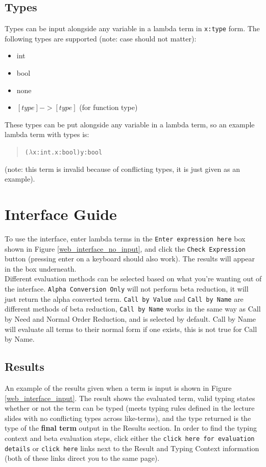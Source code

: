 \documentclass[a4paper,11pt]{article}
\begin{document}
\subsection{Types}
Types can be input alongside any variable in a lambda term in \texttt{x:type} form. The following types are supported (note: case should not matter):

\begin{itemize}
	\item int
	\item bool
	\item none
	\item $[type] -> [type]$ (for function type)
\end{itemize}

These types can be put alongside any variable in a lambda term, so an example lambda term with types is:
\begin{quotation} \texttt{($\lambda$x:int.x:bool)y:bool} \end{quotation}
(note: this term is invalid because of conflicting types, it is just given as an example).

\section{Interface Guide}

To use the interface, enter lambda terms in the \texttt{Enter expression here} box shown in Figure \ref{web_interface_no_input}, and click the \texttt{Check Expression} button (pressing enter on a keyboard should also work). The results will appear in the box underneath.\\

Different evaluation methods can be selected based on what you're wanting out of the interface. \texttt{Alpha Conversion Only} will not perform beta reduction, it will just return the alpha converted term. \texttt{Call by Value} and \texttt{Call by Name} are different methods of beta reduction, \texttt{Call by Name} works in the same way as Call by Need and Normal Order Reduction, and is selected by default. Call by Name will evaluate all terms to their normal form if one exists, this is not true for Call by Name.\\

\subsection{Results}

An example of the results given when a term is input is shown in Figure \ref{web_interface_input}. The result shows the evaluated term, valid typing states whether or not the term can be typed (meets typing rules defined in the lecture slides with no conflicting types across like-terms), and the type returned is the type of the \textbf{final term} output in the Results section. In order to find the typing context and beta evaluation steps, click either the \texttt{click here for evaluation details} or \texttt{click here} links next to the Result and Typing Context information (both of these links direct you to the same page).\\
\end{document}
